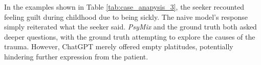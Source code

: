 In the examples shown in Table \ref{tab:case_anapysis_3}, the seeker recounted feeling guilt during childhood due to being sickly. The naive model's response simply reiterated what the seeker said. \textit{PsyMix} and the ground truth both asked deeper questions, with the ground truth attempting to explore the causes of the trauma. However, ChatGPT merely offered empty platitudes, potentially hindering further expression from the patient.



\begin{comment}
\begin{table*}[htbp]
    \centering
    \begin{tabular}{|p{15.5cm}|}
    \hline
    \textbf{Dialog History} 
    \par \textit{Counselor}: You just mentioned that you don't like interacting with people. When did this discovery start?
    \par \textit{Seeker}:  It's been about [1-6 months ago] I guess.
    \par ...
    \par \textit{Seeker}: Yes, I feel that too, I want to grow quickly. But I feel very frustrated in life.
    \par \textit{Counselor}: In the past six months, is there anything memorable that made you feel this way?
    \par \textit{Seeker}: Yes, especially recently when I went to lead an activity with children. Throughout the whole process, I felt very absent-minded, I had no idea what the children were thinking, I only focused on my own process and what I was saying, the children couldn't keep up with me at all, I didn't know.
    \\
    \hline
    \textbf{Response generation} 
    \par \textit{naive}: \textcolor{blue!50!black}{Hmm, it sounds like there's some frustration.}
    \par \textit{gpt}: \textcolor{green!50!black}{It sounds like you felt confused and frustrated during that activity, finding it difficult to understand the needs and emotional states of the children. This may be part of your complex inner feelings.}
    \par \textit{PsyMix}: \textcolor{blue!50!black}{Hmm, it sounds like you're completely immersed in your own world, not paying attention to others' feelings.} \textcolor{green!50!black}{Why do you think that is?}
    \par \textit{ground truth}: \textcolor{green!50!black}{Oh, is this your job? What activities did you do?}\textcolor{blue!50!black}{That absent-minded feeling doesn't seem comfortable.}
    \\
    \hline
    \end{tabular}
    \caption{Case Analysis. } 
    \label{tab:case_anapysis_1}
\end{table*}
\end{comment}


